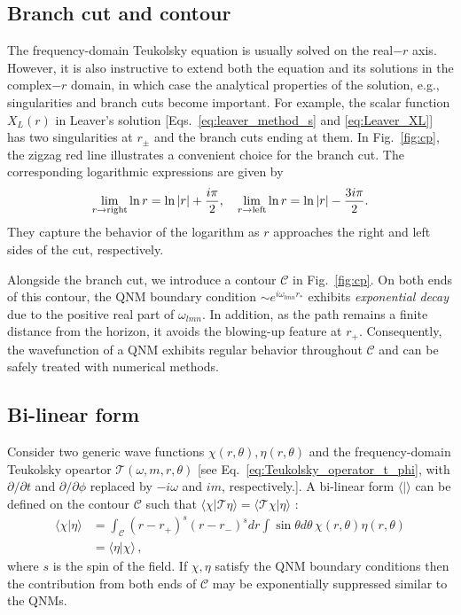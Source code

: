 \documentclass[aps,prd,amsmath,floats,floatfix, twocolumn,
superscriptaddress,nofootinbib,showpacs]{revtex4-1}
\begin{document}
\subsection{Branch cut and contour}
\label{subsec:contour_review}
The frequency-domain Teukolsky equation is usually solved on the real$-r$ axis. However, it is also instructive to extend both the equation and its solutions in the complex$-r$ domain, in which case the analytical properties of the solution, e.g., singularities and branch cuts become important. For example, the scalar function $X_L(r)$ in Leaver's solution [Eqs.~\eqref{eq:leaver_method_s} and \eqref{eq:Leaver_XL}] has two singularities at $r_\pm$ and the branch cuts ending at them. In Fig.~\ref{fig:cp}, the zigzag red line illustrates a convenient choice for the branch cut. The corresponding logarithmic expressions are given by
\begin{align}
    \lim_{r\to\rm right} \ln r =\ln |r| + \frac{i\pi}{2}, \quad
    \lim_{r\to\rm left} \ln r =\ln |r| - \frac{3i\pi}{2}.
\end{align}
They capture the behavior of the logarithm as $r$ approaches the right and left sides of the cut, respectively.

Alongside the branch cut, we introduce a contour $\mathcal{C}$ in Fig.~\ref{fig:cp}. On both ends of this contour, the QNM boundary condition $\sim e^{i \omega_{lmn}r_*}$ exhibits \textit{exponential decay} due to the positive real part of $\omega_{lmn}$. In addition, as the path remains a finite distance from the horizon, it avoids the blowing-up feature at $r_+$. Consequently, the wavefunction of a QNM exhibits regular behavior throughout $\mathcal{C}$ and can be safely treated with numerical methods.

\subsection{Bi-linear form}
\label{subsec:bi_linear_form}
Consider two generic wave functions $\chi(r,\theta),\eta(r,\theta)$ and  the frequency-domain Teukolsky opeartor $\mathcal{T}(\omega, m,r,\theta)$ [see Eq.~\eqref{eq:Teukolsky_operator_t_phi}, with $\partial/\partial t$ and $\partial/\partial \phi$ replaced by $-i\omega$ and $im$, respectively.]. A bi-linear form $\langle | \rangle$ can be defined on the contour $\mathcal{C}$
such that $\langle \chi | \mathcal{T} \eta\rangle =\langle  \mathcal{T \chi | \eta\rangle }$ \cite{Yang:2014tla, Mark:2014aja, Zimmerman:2014aha}:
\begin{align}\label{eq:bil}
\langle \chi | \eta \rangle & =\int_{\mathcal{C}} (r-r_+)^s(r-r_-)^s dr \int \sin\theta d \theta \,\chi(r,\theta) \eta(r,\theta)\nonumber \\
& = \langle \eta | \chi \rangle\,,
\end{align}
where $s$ is the spin of the field. If $\chi,\eta$ satisfy the QNM boundary conditions then the contribution from both ends of $\mathcal{C}$ may be exponentially suppressed similar to the QNMs.
\end{document}
